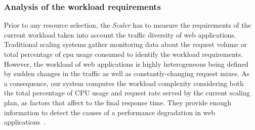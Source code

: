 






\subsubsection{Analysis of the workload requirements\label{workloadReq}}

Prior to any resource selection, the \emph{Scaler} has to measure the requirements of the current workload taken into account the traffic diversity of web applications. Traditional scaling systems gather monitoring data about the request volume or total percentage of cpu usage consumed to identify the workload requirements. However, the workload of web applications is highly heterogeneous being defined by sudden changes in the traffic as well as constantly-changing request mixes. As a consequence, our system computes the workload complexity considering both the total percentage of CPU usage and request rate served by the current scaling plan,  as factors that affect to the final response time. They provide enough information to detect the causes of a performance degradation in web applications~\cite{smartscale_2012}. 

